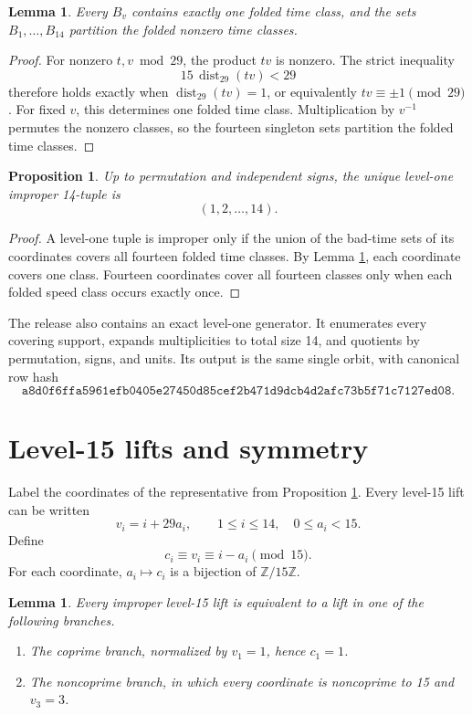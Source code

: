 \documentclass[11pt]{article}
\newtheorem{lemma}[theorem]{Lemma}
\newtheorem{proposition}[theorem]{Proposition}
\newcommand{\distm}[2]{\operatorname{dist}_{#1}(#2)}
\newcommand{\Z}{\mathbb{Z}}
\begin{document}
\begin{lemma}
\label{lem:singleton-bad}
Every \(B_v\) contains exactly one folded time class, and the sets
\(B_1,\ldots,B_{14}\) partition the folded nonzero time classes.
\end{lemma}

\begin{proof}
For nonzero \(t,v\bmod 29\), the product \(tv\) is nonzero.  The strict
inequality
\[
  15\,\distm{29}{tv}<29
\]
therefore holds exactly when \(\distm{29}{tv}=1\), or equivalently
\(tv\equiv\pm1\pmod{29}\).  For fixed \(v\), this determines one folded
time class.  Multiplication by \(v^{-1}\) permutes the nonzero classes, so
the fourteen singleton sets partition the folded time classes.
\end{proof}

\begin{proposition}
\label{prop:level-one}
Up to permutation and independent signs, the unique level-one improper
14-tuple is
\[
  (1,2,\ldots,14).
\]
\end{proposition}

\begin{proof}
A level-one tuple is improper only if the union of the bad-time sets of its
coordinates covers all fourteen folded time classes.  By Lemma
\ref{lem:singleton-bad}, each coordinate covers one class.  Fourteen
coordinates cover all fourteen classes only when each folded speed class
occurs exactly once.
\end{proof}

The release also contains an exact level-one generator.  It enumerates every
covering support, expands multiplicities to total size 14, and quotients by
permutation, signs, and units.  Its output is the same single orbit, with
canonical row hash
\[
\texttt{a8d0f6ffa5961efb0405e27450d85cef2b471d9dcb4d2afc73b5f71c7127ed08}.
\]

\section{Level-15 lifts and symmetry}

Label the coordinates of the representative from Proposition
\ref{prop:level-one}.  Every level-15 lift can be written
\[
  v_i=i+29a_i,
  \qquad 1\leq i\leq14,\quad 0\leq a_i<15.
\]
Define
\[
  c_i\equiv v_i\equiv i-a_i\pmod{15}.
\]
For each coordinate, \(a_i\mapsto c_i\) is a bijection of
\(\Z/15\Z\).

\begin{lemma}
\label{lem:symmetry-split}
Every improper level-15 lift is equivalent to a lift in one of the following
branches.
\begin{enumerate}[label=(\alph*),leftmargin=2.2em]
  \item The coprime branch, normalized by \(v_1=1\), hence \(c_1=1\).
  \item The noncoprime branch, in which every coordinate is noncoprime to
        15 and \(v_3=3\).
\end{enumerate}
\end{lemma}
\end{document}
